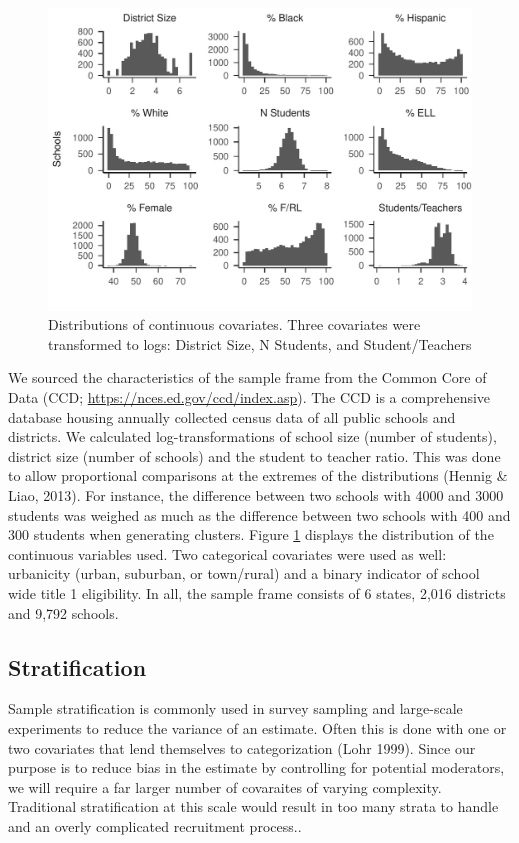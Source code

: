 \documentclass[
  english,
  man,floatsintext]{apa6}
\begin{document}
\begin{figure}
\centering
\includegraphics{GenSamp-Paper_files/figure-latex/plot-dist1-1.pdf}
\caption{\label{fig:plot-dist1}Distributions of continuous covariates. Three covariates were transformed to logs: District Size, N Students, and Student/Teachers}
\end{figure}

We sourced the characteristics of the sample frame from the Common Core of Data (CCD; \url{https://nces.ed.gov/ccd/index.asp}). The CCD is a comprehensive database housing annually collected census data of all public schools and districts. We calculated log-transformations of school size (number of students), district size (number of schools) and the student to teacher ratio. This was done to allow proportional comparisons at the extremes of the distributions (Hennig \& Liao, 2013). For instance, the difference between two schools with 4000 and 3000 students was weighed as much as the difference between two schools with 400 and 300 students when generating clusters. Figure \ref{fig:plot-dist1} displays the distribution of the continuous variables used. Two categorical covariates were used as well: urbanicity (urban, suburban, or town/rural) and a binary indicator of school wide title 1 eligibility. In all, the sample frame consists of 6 states, 2,016 districts and 9,792 schools.

\hypertarget{stratification}{%
\subsection{Stratification}\label{stratification}}

Sample stratification is commonly used in survey sampling and large-scale experiments to reduce the variance of an estimate. Often this is done with one or two covariates that lend themselves to categorization (Lohr 1999). Since our purpose is to reduce bias in the estimate by controlling for potential moderators, we will require a far larger number of covaraites of varying complexity. Traditional stratification at this scale would result in too many strata to handle and an overly complicated recruitment process..
\end{document}
